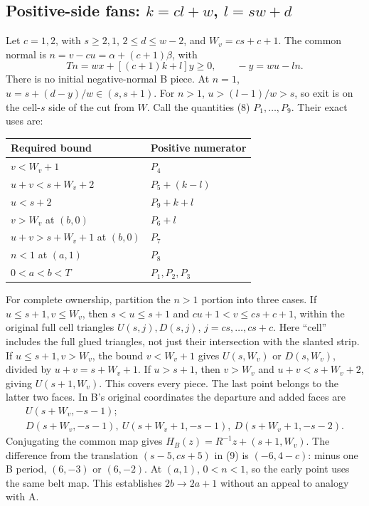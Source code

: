 \documentclass[11pt]{amsart}
\begin{document}
\subsection{Positive-side fans: \texorpdfstring{$k=cl+w$, $l=sw+d$}{k=cl+w, l=sw+d}}
Let $c=1,2$, with $s\ge2,1$, $2\le d\le w-2$, and
$W_v=cs+c+1$. The common normal is
$n=v-cu=\alpha+(c+1)\beta$, with
\[
Tn=wx+[(c+1)k+l]y\ge0,\qquad -y=wu-ln.
\]
There is no initial negative-normal B piece. At $n=1$,
$u=s+(d-y)/w\in(s,s+1)$. For $n>1$,
$u>(l-1)/w>s$, so exit is on the cell-$s$ side of the cut from $W$.
Call the quantities (8) $P_1,\ldots,P_9$. Their exact uses are:
\begin{center}\small
\begin{tabular}{ll}\toprule
Required bound & Positive numerator\\\midrule
$v<W_v+1$ & $P_4$\\
$u+v<s+W_v+2$ & $P_5+(k-l)$\\
$u<s+2$ & $P_9+k+l$\\
$v>W_v$ at $(b,0)$ & $P_6+l$\\
$u+v>s+W_v+1$ at $(b,0)$ & $P_7$\\
$n<1$ at $(a,1)$ & $P_8$\\
$0<a<b<T$ & $P_1,P_2,P_3$\\\bottomrule
\end{tabular}\end{center}
For complete ownership, partition the $n>1$ portion into three cases.
If $u\le s+1,v\le W_v$, then $s<u\le s+1$ and
$cu+1<v\le cs+c+1$, within the original full cell triangles
$U(s,j),D(s,j)$, $j=cs,\ldots,cs+c$. Here ``cell'' includes the full
glued triangles, not just their intersection with the slanted strip.
If $u\le s+1,v>W_v$, the bound $v<W_v+1$ gives $U(s,W_v)$ or
$D(s,W_v)$, divided by $u+v=s+W_v+1$.
If $u>s+1$, then $v>W_v$ and $u+v<s+W_v+2$, giving $U(s+1,W_v)$.
This covers every piece. The last point belongs to the latter two faces.
In B's original coordinates the departure and added faces are
\[
\begin{gathered}
U(s+W_v,-s-1);\\
D(s+W_v,-s-1),\ U(s+W_v+1,-s-1),\ D(s+W_v+1,-s-2).
\end{gathered}
\]
Conjugating the common map gives
$H_B(z)=R^{-1}z+(s+1,W_v)$. The difference from the translation
$(s-5,cs+5)$ in (9) is $(-6,4-c)$: minus one B period,
$(6,-3)$ or $(6,-2)$. At $(a,1)$, $0<n<1$, so the early point
uses the same belt map. This establishes $2b\to2a+1$ without an
appeal to analogy with A.
\end{document}
